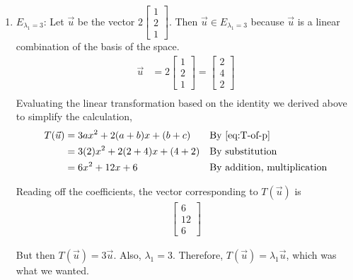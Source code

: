 \documentclass[10pt,letterpaper,final]{report}
\newcommand{\reason}[1]{&& \text{#1}}
\begin{document}
\begin{enumerate}[label=(\alph*)]
        \begin{enumerate}
          \item $E_{\lambda_1 = 3}$: Let $\vec{u}$ be the vector $2\begin{bmatrix}1\\2\\1\end{bmatrix}$. Then $\vec{u} \in E_{\lambda_1 = 3}$ because $\vec{u}$ is a linear combination of the basis of the space.
                \begin{align*}
                  \vec{u} & = 2\begin{bmatrix}1\\2\\1\end{bmatrix} = \begin{bmatrix}
                                                                       2 \\4\\2
                                                                     \end{bmatrix} \\[1ex]
                \end{align*}
                Evaluating the linear transformation based on the identity we derived above to simplify the calculation,
                \begin{align*}
                  T(\vec{u}) & = 3ax^2 + 2(a+b)x + (b + c) \reason{By \eqref{eq:T-of-p}} \\
                             & = 3(2)x^2 + 2(2+4)x + (4 + 2) \reason{By substitution}    \\
                             & = 6x^2 + 12x + 6 \reason{By addition, multiplication}
                \end{align*}

                Reading off the coefficients, the vector corresponding to $T(\vec{u})$ is
                \begin{align*}
                  \begin{bmatrix}
                    6 \\12\\6
                  \end{bmatrix}
                \end{align*}

                But then $T(\vec{u}) = 3\vec{u}$. Also, $\lambda_1 = 3$. Therefore, $T(\vec{u}) = \lambda_1\vec{u}$, which was what we wanted.


\end{enumerate}
\end{enumerate}
\end{document}
